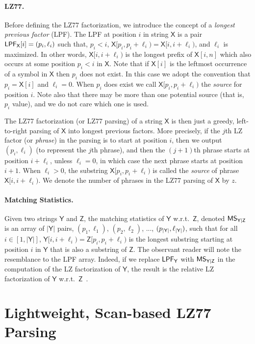 \documentclass[runningheads]{llncs}
\def\X{\textsf{X}}
\def\MS{\mbox{\rm {\sf MS}}}
\def\Y{\mbox{\rm {\sf Y}}}
\def\Y{\textsf{Y}}
\def\ssY{\mbox{\rm {\sf {\scriptsize Y}}}}
\def\Z{\textsf{Z}}
\def\LPF{\mbox{\rm {\sf LPF}}}
\def\YZ{\mbox{\rm {\sf {\scriptsize Y$|$Z}}}}
\begin{document}
\paragraph{LZ77.}
Before defining the LZ77 factorization, we introduce the concept of a
{\em longest previous factor} (LPF).  The LPF at position $i$ in
string $\X$ is a pair $\LPF_{\X}[i]=(p_i,\ell_i)$ such that, $p_i < i$,
$\X[p_i,p_i+\ell_i) = \X[i,i+\ell_i)$, and $\ell_i$ is maximized.
In other words, $\X[i,i+\ell_i)$ is the longest
prefix of $\X[i,n]$ which also occurs at some position $p_i < i$ in
$\X$. Note that if $\X[i]$ is the leftmost occurrence of a symbol in
$\X$ then $p_i$ does not exist. In this case we adopt the convention
that $p_i = \X[i]$ and $\ell_i = 0$. When $p_i$ does exist we call
$\X[p_i,p_i+\ell_i)$ the {\em source} for position $i$. Note also
that there may be more than one potential source (that is, $p_i$
value), and we do not care which one is used.

The LZ77 factorization (or LZ77 parsing) of a string $\X$ is then just
a greedy, left-to-right parsing of $\X$ into longest previous
factors. More precisely, if the $j$th LZ factor (or {\em phrase}) in
the parsing is to start at position $i$, then we output $(p_i,\ell_i)$
(to represent the $j$th phrase), and then the $(j+1)$th phrase starts
at position $i+\ell_i$, unless $\ell_i = 0$, in which case the next
phrase starts at position $i+1$.  When $\ell_i > 0$, the substring
$\X[p_i,p_i+\ell_i)$ is called the {\em source} of phrase
$\X[i,i+\ell_i)$. We denote the number of phrases in the
LZ77 parsing of $\X$ by $z$.

\paragraph{Matching Statistics.}
Given two strings $\Y$ and $\Z$, the matching statistics of $\Y$
w.r.t.~$\Z$, denoted $\MS_{\YZ}$ is an array of $|\Y|$ pairs,
$(p_1,\ell_1)$, $(p_2,\ell_2)$, ..., $(p_{|\ssY|},\ell_{|\ssY|})$,
such that for all $i \in [1,|\Y|]$, $\Y[i,i+\ell_i) =
\Z[p_i,p_i+\ell_i)$ is the longest substring starting at position $i$
in $\Y$ that is also a substring of $\Z$. The observant reader will
note the resemblance to the LPF array. Indeed, if we replace
$\LPF_{\Y}$ with $\MS_{\YZ}$ in the computation of the LZ factorization
of $\Y$, the result is the relative LZ factorization of $\Y$
w.r.t.~$\Z$~\cite{RLZspire2010}.

\section{Lightweight, Scan-based LZ77 Parsing}
\label{sec-algorithm}
\end{document}
